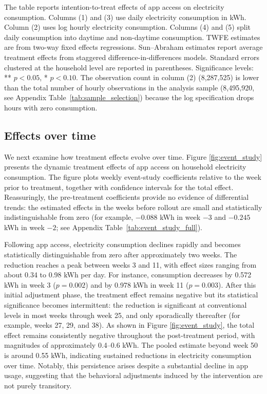 \begin{table}[H]
\begin{threeparttable}
\begin{tablenotes}[flushleft]
\footnotesize
\item The table reports intention-to-treat effects of app access on electricity consumption. Columns (1) and (3) use daily electricity consumption in kWh. Column (2) uses log hourly electricity consumption. Columns (4) and (5) split daily consumption into daytime and non-daytime consumption. TWFE estimates are from two-way fixed effects regressions. Sun--Abraham estimates report average treatment effects from staggered difference-in-differences models. Standard errors clustered at the household level are reported in parentheses. Significance levels: ** $p<0.05$, * $p<0.10$. The observation count in column (2) (8,287,525) is lower than the total number of hourly observations in the analysis sample (8,495,920, see Appendix Table~\ref{tab:sample_selection}) because the log specification drops hours with zero consumption.
\end{tablenotes}

\end{threeparttable}
\end{table}
\subsection{Effects over time}
We next examine how treatment effects evolve over time. Figure \ref{fig:event_study} presents the dynamic treatment effects of app access on household electricity consumption. The figure plots weekly event-study coefficients relative to the week prior to treatment, together with confidence intervals for the total effect. Reassuringly, the pre-treatment coefficients provide no evidence of differential trends: the estimated effects in the weeks before rollout are small and statistically indistinguishable from zero (for example, $-0.088$ kWh in week $-3$ and $-0.245$ kWh in week $-2$; see Appendix Table~\ref{tab:event_study_full}).

Following app access, electricity consumption declines rapidly and becomes statistically distinguishable from zero after approximately two weeks. The reduction reaches a peak between weeks 3 and 11, with effect sizes ranging from about 0.34 to 0.98 kWh per day. For instance, consumption decreases by 0.572 kWh in week 3 ($p = 0.002$) and by 0.978 kWh in week 11 ($p = 0.003$). After this initial adjustment phase, the treatment effect remains negative but its statistical significance becomes intermittent: the reduction is significant at conventional levels in most weeks through week 25, and only sporadically thereafter (for example, weeks 27, 29, and 38). As shown in Figure \ref{fig:event_study}, the total effect remains consistently negative throughout the post-treatment period, with magnitudes of approximately 0.4–0.6 kWh. The pooled estimate beyond week 50 is around 0.55 kWh, indicating sustained reductions in electricity consumption over time. Notably, this persistence arises despite a substantial decline in app usage, suggesting that the behavioral adjustments induced by the intervention are not purely transitory. 

